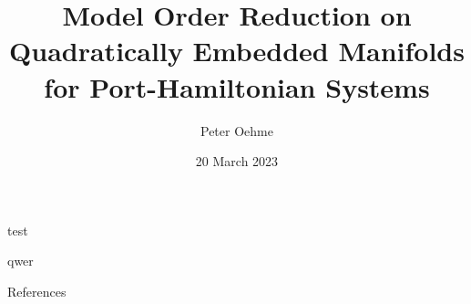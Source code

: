 

\author{Peter Oehme}
\title[MOR on Quadratically Embedded Manifolds for pH Systems]{Model Order Reduction on Quadratically Embedded Manifolds for Port-Hamiltonian Systems}
\date{20 March 2023}


    {
        \begin{frame}
            \maketitle
        \end{frame}
    }

    \setcounter{framenumber}{0} %

    \begin{frame}{test}
        \begin{theorem}
            qwer
        \end{theorem}
    \end{frame}

    \begin{frame}[allowframebreaks]{References}
        \printbibliography[
            heading=none
        ]
    \end{frame}
